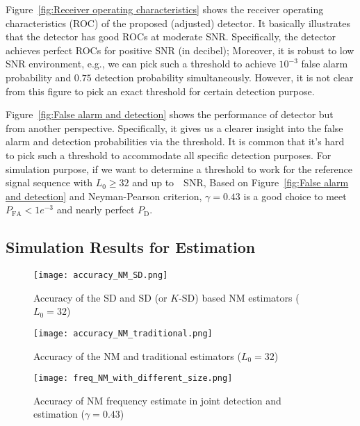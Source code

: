 Figure~\ref{fig:Receiver operating characteristics} shows the receiver operating characteristics (ROC) of the proposed (adjusted) detector.
It basically illustrates that the detector has good ROCs at moderate SNR. Specifically, the detector achieves perfect ROCs for positive SNR (in decibel); 
Moreover, it is robust to low SNR environment, e.g., we can pick such a threshold to achieve 
$10^{-3}$ false alarm probability and $0.75$ detection probability simultaneously.
However, it is not clear from this figure to pick an exact threshold for certain detection purpose.

Figure~\ref{fig:False alarm and detection} shows the performance of detector but from another perspective. Specifically, it gives us a clearer insight into
the false alarm and detection probabilities via the threshold.
It is common that it's hard to pick such a threshold to accommodate all specific detection purposes.
For simulation purpose, if we want to determine a threshold to work for the reference signal sequence with $L_0 {\geq} 32$ and up to~\dB~SNR,
Based on Figure~\ref{fig:False alarm and detection} and Neyman-Pearson criterion, $\gamma=0.43$ is a good choice to meet $P_{\text{FA}}<1e^{-3}$ and nearly perfect $P_{\text{D}}$.

\subsection{Simulation Results for Estimation}

\begin{figure}[t]
    \centerline{\texttt{[image: accuracy\_NM\_SD.png]}}
    \caption{Accuracy of the SD and SD (or $K$-SD) based NM estimators ($L_0=32$)}
    \label{fig:accuracy_NM_SD}
    \end{figure}

\begin{figure}[t]
    \centerline{\texttt{[image: accuracy\_NM\_traditional.png]}}
    \caption{Accuracy of the NM and traditional estimators ($L_0=32$)}
    \label{fig:accuracy_NM_traditional}
    \end{figure}

\begin{figure}[t]
    \centerline{\texttt{[image: freq\_NM\_with\_different\_size.png]}}
    \caption{Accuracy of NM frequency estimate in joint detection and estimation ($\gamma=0.43$)}
    \label{fig:accuracy_freq_NM_joint}
    \end{figure}

